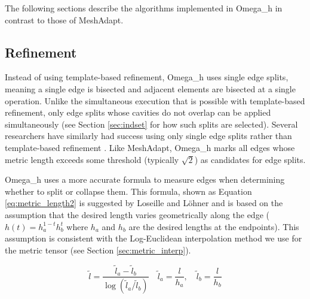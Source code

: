 The following sections describe the algorithms implemented
in Omega\_h in contrast to those of MeshAdapt.

\subsection{Refinement}
\label{sec:osh_refine}

Instead of using template-based refinement, Omega\_h
uses single edge splits, meaning a single edge is
bisected and adjacent elements are bisected
at a single operation.
Unlike the simultaneous execution that is possible
with template-based refinement, only edge
splits whose cavities do not overlap can be
applied simultaneously (see Section \ref{sec:indset}
for how such splits are selected).
Several researchers have similarly had success
using only single edge splits rather than
template-based refinement
\cite{compere2010mesh,loseille20093d,michal2012anisotropic}.
Like MeshAdapt, Omega\_h marks all edges whose
metric length exceeds some threshold (typically $\sqrt{2}$) as candidates
for edge splits.

Omega\_h uses a more accurate formula to measure
edges when determining whether to split or collapse them.
This formula, shown as Equation \ref{eq:metric_length2}
is suggested by Loseille and L{\"o}hner \cite{loseille20093d} and
is based on the assumption that the desired length varies
geometrically along the edge ($h(t)=h_a^{1-t}h_b^t$ where $h_a$ and $h_b$
are the desired lengths at the endpoints).
This assumption is consistent with the Log-Euclidean interpolation method we
use for the metric tensor (see Section \ref{sec:metric_interp}).

\begin{equation} \label{eq:metric_length2}
\tilde{l} =
\frac{\tilde{l}_a - \tilde{l}_b}{\log\left(\tilde{l}_a / \tilde{l}_b\right)}
\quad
\tilde{l}_a = \frac{l}{h_a},\quad
\tilde{l}_b = \frac{l}{h_b}
\end{equation}

